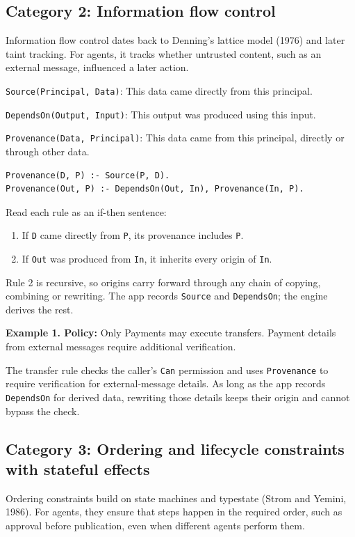 \documentclass[11pt,letter]{article}
\newcommand{\pred}[2]{\texttt{#1}: #2\par}
\begin{document}
\subsection*{Category 2: Information flow control}
Information flow control dates back to Denning's lattice model (1976) and
later taint tracking. For agents, it tracks whether untrusted content, such
as an external message, influenced a later action.

\pred{Source(Principal, Data)}{This data came directly from this principal.}
\pred{DependsOn(Output, Input)}{This output was produced using this input.}
\pred{Provenance(Data, Principal)}{This data came from this principal,
directly or through other data.}

\begin{lstlisting}
Provenance(D, P) :- Source(P, D).
Provenance(Out, P) :- DependsOn(Out, In), Provenance(In, P).
\end{lstlisting}
Read each rule as an if-then sentence:
\begin{enumerate}
\item If \texttt{D} came directly from \texttt{P}, its provenance includes \texttt{P}.
\item If \texttt{Out} was produced from \texttt{In}, it inherits every origin of \texttt{In}.
\end{enumerate}
Rule 2 is recursive, so origins carry forward through any chain of copying,
combining or rewriting. The app records \texttt{Source} and \texttt{DependsOn};
the engine derives the rest.

\begin{originalpolicy}
\textbf{Example 1. Policy:} Only Payments may execute transfers. Payment details from
external messages require additional verification.
\end{originalpolicy}
The transfer rule checks the caller's \texttt{Can} permission and uses
\texttt{Provenance} to require verification for external-message details.
As long as the app records \texttt{DependsOn} for derived data, rewriting
those details keeps their origin and cannot bypass the check.


\subsection*{Category 3: Ordering and lifecycle constraints with stateful effects}
Ordering constraints build on state machines and typestate (Strom and Yemini,
1986). For agents, they ensure that steps happen in the required order, such
as approval before publication, even when different agents perform them.
\end{document}
